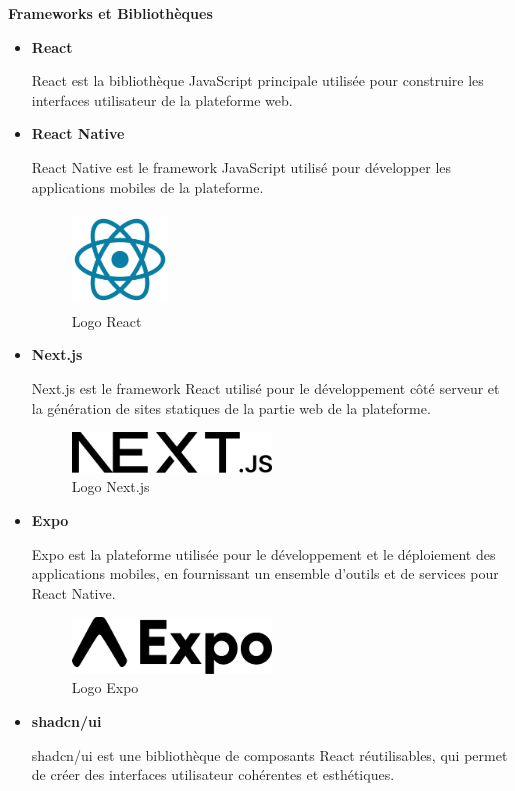 \textbf{Frameworks et Bibliothèques}
\begin{itemize}
  \item \textbf{React}

    React est la bibliothèque JavaScript principale utilisée pour construire
    les interfaces utilisateur de la plateforme web.

  \item \textbf{React Native}

    React Native est le framework JavaScript utilisé pour développer les
    applications mobiles de la plateforme.

    \begin{figure}[htbp]
      \centering
      \includegraphics[width=1.0in, height=1.0in]{images/React_Logo_SVG.svg.png}
      \caption{Logo React}
    \end{figure}

  \item \textbf{Next.js}

    Next.js est le framework React utilisé pour le développement côté serveur
    et la génération de sites statiques de la partie web de la plateforme.

    \begin{figure}[H]
      \centering
      \includegraphics[width=0.5\textwidth]{images/Nextjs-logo.svg.png}
      \caption{Logo Next.js}
    \end{figure}

  \item \textbf{Expo}

    Expo est la plateforme utilisée pour le développement et le déploiement
    des applications mobiles, en fournissant un ensemble d'outils et de
    services pour React Native.

    \begin{figure}[H]
      \centering
      \includegraphics[width=0.5\textwidth]{images/logo-wordmark.png}
      \caption{Logo Expo}
    \end{figure}

  \item \textbf{shadcn/ui}

    shadcn/ui est une bibliothèque de composants React réutilisables, qui
    permet de créer des interfaces utilisateur cohérentes et esthétiques.
\end{itemize}


